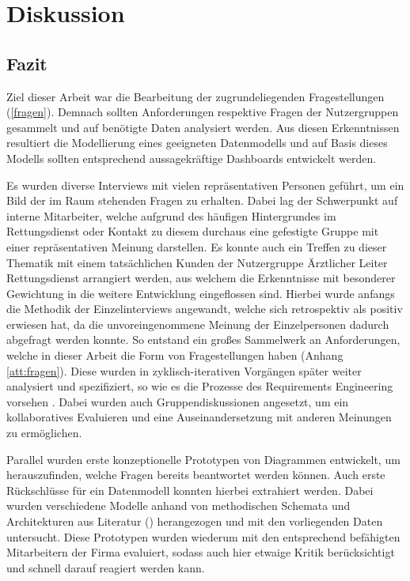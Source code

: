 \chapter{Diskussion}
\label{fazit}
\minitoc\pagebreak

\section{Fazit}
Ziel dieser Arbeit war die Bearbeitung der zugrundeliegenden Fragestellungen (\ref{fragen}).
Demnach sollten Anforderungen respektive Fragen der Nutzergruppen gesammelt und auf benötigte Daten analysiert werden.
Aus diesen Erkenntnissen resultiert die Modellierung eines geeigneten Datenmodells und auf Basis dieses Modells sollten entsprechend aussagekräftige Dashboards entwickelt werden.

Es wurden diverse Interviews mit vielen repräsentativen Personen geführt, um ein Bild der im Raum stehenden Fragen zu erhalten.
Dabei lag der Schwerpunkt auf interne Mitarbeiter, welche aufgrund des häufigen Hintergrundes im Rettungsdienst oder Kontakt zu diesem durchaus eine gefestigte Gruppe mit einer repräsentativen Meinung darstellen.
Es konnte auch ein Treffen zu dieser Thematik mit einem tatsächlichen Kunden der Nutzergruppe \glqq Ärztlicher Leiter Rettungsdienst\grqq{} arrangiert werden, aus welchem die Erkenntnisse mit besonderer Gewichtung in die weitere Entwicklung eingeflossen sind.
Hierbei wurde anfangs die Methodik der Einzelinterviews angewandt, welche sich retrospektiv als positiv erwiesen hat, da die unvoreingenommene Meinung der Einzelpersonen dadurch abgefragt werden konnte.
So entstand ein großes Sammelwerk an Anforderungen, welche in dieser Arbeit die Form von Fragestellungen haben (Anhang \ref{att:fragen}).
Diese wurden in zyklisch-iterativen Vorgängen später weiter analysiert und spezifiziert, so wie es die Prozesse des Requirements Engineering vorsehen \cite{ Bergsmann.2018, Leffingwell.2011, Patig., Pohl.2011}. 
Dabei wurden auch Gruppendiskussionen angesetzt, um ein kollaboratives Evaluieren und eine Auseinandersetzung mit anderen Meinungen zu ermöglichen.

Parallel wurden erste konzeptionelle Prototypen von Diagrammen entwickelt, um herauszufinden, welche Fragen bereits beantwortet werden können.
Auch erste Rückschlüsse für ein Datenmodell konnten hierbei extrahiert werden.
Dabei wurden verschiedene Modelle anhand von methodischen Schemata und Architekturen aus Literatur (\cite{Bauer.2004, Gabriel.2011, Gitelman.2013, Kimball.2013, Mucksch.2000}) herangezogen und mit den vorliegenden Daten untersucht.
Diese Prototypen wurden wiederum mit den entsprechend befähigten Mitarbeitern der Firma evaluiert, sodass auch hier etwaige Kritik berücksichtigt und schnell darauf reagiert werden kann.

